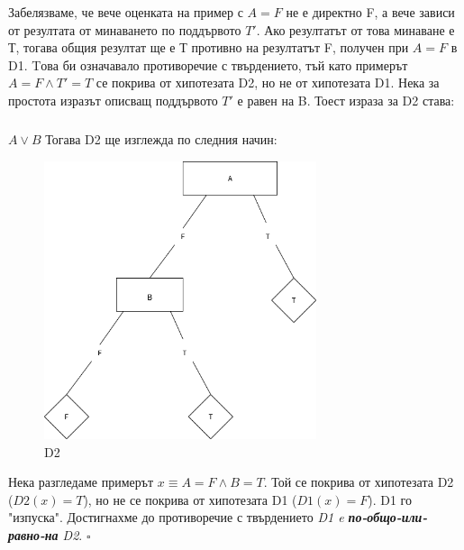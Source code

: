 \documentclass[12pt]{article}
\begin{document}
	Забелязваме, че вече оценката на пример с $A = F$ не е директно F, а вече зависи от резултата от минаването по поддървото $T'$. Ако резултатът от това минаване е Т, тогава общия резултат ще е Т противно на резултатът F, получен при $A = F$ в D1. Tова би означавало противоречие с твърдението, тъй като примерът $A = F \land T' = T$ се покрива от хипотезата D2, но не от хипотезата D1. Нека за простота изразът описващ поддървото $T'$ е равен на B. Тоест израза за D2 става:
	\subparagraph{}
	$A \lor B$
	\newline\newline
	Тогава D2 ще изглежда по следния начин:
	\begin{figure}[H]
		\centering
		\includegraphics[width=80mm]{Untitled Diagram10.png} 
		\caption{D2}
	\end{figure}
	
	Нека разгледаме примерът $x \equiv A = F \land B = T$. Той се покрива от хипотезата D2 ($D2(x) = T$), но не се покрива от хипотезата D1 ($D1(x) = F$). D1 го "изпуска". Достигнахме до противоречие с твърдението \textit{D1 e \textbf{по-общо-или-равно-на} D2}. $\square$
	
\end{document}
